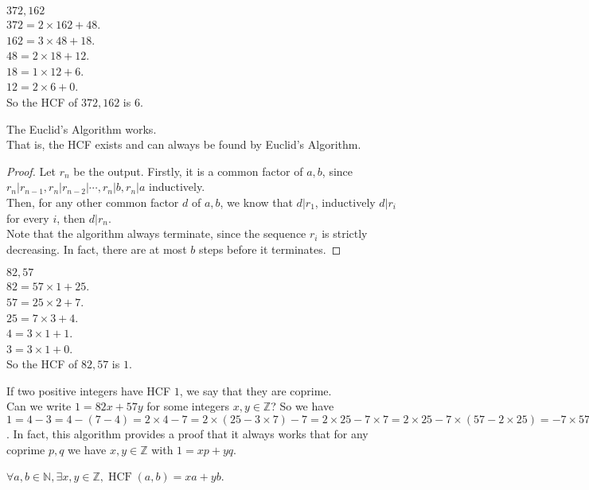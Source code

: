 \begin{example}
    $372,162$\\
    $372=2\times 162+48$.\\
    $162=3\times 48+18$.\\
    $48=2\times 18+12$.\\
    $18=1\times 12+6$.\\
    $12=2\times 6+0$.\\
    So the HCF of $372,162$ is $6$.
\end{example}
\begin{theorem}
    The Euclid's Algorithm works.\\
    That is, the HCF exists and can always be found by Euclid's Algorithm.
\end{theorem}
\begin{proof}
    Let $r_n$ be the output.
    Firstly, it is a common factor of $a,b$, since $r_n|r_{n-1},r_n|r_{n-2}|\cdots,r_n|b,r_n|a$ inductively.\\
    Then, for any other common factor $d$ of $a,b$, we know that $d|r_1$, inductively $d|r_i$ for every $i$, then $d|r_n$.\\
    Note that the algorithm always terminate, since the sequence $r_i$ is strictly decreasing.
    In fact, there are at most $b$ steps before it terminates.
\end{proof}
\begin{example}
    $82,57$\\
    $82=57\times 1+25$.\\
    $57=25\times 2+7$.\\
    $25=7\times 3+4$.\\
    $4=3\times 1+1$.\\
    $3=3\times 1+0$.\\
    So the HCF of $82,57$ is $1$.
\end{example}
If two positive integers have HCF $1$, we say that they are coprime.\\
Can we write $1=82x+57y$ for some integers $x,y\in\mathbb Z$?
So we have $1=4-3=4-(7-4)=2\times 4-7=2\times (25-3\times 7)-7=2\times 25-7\times 7=2\times 25-7\times(57-2\times 25)=-7\times 57+16\times 25=-7\times 57+16\times(82-57)=-23\times 57+16\times 82$.
In fact, this algorithm provides a proof that it always works that for any coprime $p,q$ we have $x,y\in\mathbb Z$ with $1=xp+yq$.
\begin{theorem}
    $\forall a,b\in\mathbb N,\exists x,y\in\mathbb Z,\operatorname{HCF}(a,b)=xa+yb$.
\end{theorem}
